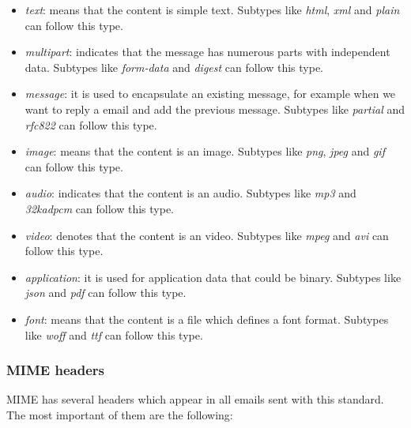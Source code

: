 \begin{itemize}
	\item\textit{text}: means that the content is simple text. Subtypes like \textit{html}, \textit{xml} and \textit{plain} can follow this type.
	\item\textit{multipart}: indicates that the message has numerous parts with independent data. Subtypes like \textit{form-data} and \textit{digest} can follow this type.
	\item\textit{message}: it is used to encapsulate an existing message, for example when we want to reply a email and add the previous message. Subtypes like \textit{partial} and \textit{rfc822} can follow this type.
	\item\textit{image}: means that the content is an image. Subtypes like \textit{png}, \textit{jpeg} and \textit{gif} can follow this type.
	\item\textit{audio}: indicates that the content is an audio. Subtypes like \textit{mp3} and \textit{32kadpcm} can follow this type.
	\item\textit{video}: denotes that the content is an video. Subtypes like \textit{mpeg} and \textit{avi} can follow this type.
	\item\textit{application}: it is used for application data that could be binary. Subtypes like \textit{json} and \textit{pdf} can follow this type.
	\item\textit{font}: means that the content is a file which defines a font format. Subtypes like \textit{woff} and \textit{ttf} can follow this type.
\end{itemize}

\subsubsection{MIME headers} \label{sssect:MIMEheaders}

MIME has several headers which appear in all emails sent with this standard. The most important of them are the following:

